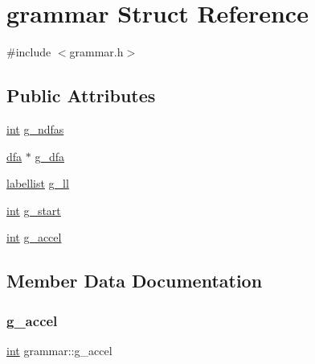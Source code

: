 \hypertarget{structgrammar}{}\section{grammar Struct Reference}
\label{structgrammar}


{\ttfamily \#include $<$grammar.\+h$>$}

\subsection*{Public Attributes}
\begin{DoxyCompactItemize}
\item 
\mbox{\hyperlink{warnings_8h_a74f207b5aa4ba51c3a2ad59b219a423b}{int}} \mbox{\hyperlink{structgrammar_abf22ce0269bc0d85b5664fc390f5441f}{g\+\_\+ndfas}}
\item 
\mbox{\hyperlink{structdfa}{dfa}} $\ast$ \mbox{\hyperlink{structgrammar_a5f1487bf454c13350ffbd11ed08cd160}{g\+\_\+dfa}}
\item 
\mbox{\hyperlink{structlabellist}{labellist}} \mbox{\hyperlink{structgrammar_a44c2b2bf052d04fe115c96ebcd3cdb6d}{g\+\_\+ll}}
\item 
\mbox{\hyperlink{warnings_8h_a74f207b5aa4ba51c3a2ad59b219a423b}{int}} \mbox{\hyperlink{structgrammar_a07f66956b24bcf1d2560f64e97738843}{g\+\_\+start}}
\item 
\mbox{\hyperlink{warnings_8h_a74f207b5aa4ba51c3a2ad59b219a423b}{int}} \mbox{\hyperlink{structgrammar_a6bfa088665e4923c32933b3f40343ce2}{g\+\_\+accel}}
\end{DoxyCompactItemize}


\subsection{Member Data Documentation}
\mbox{\label{structgrammar_a6bfa088665e4923c32933b3f40343ce2}} 
\subsubsection{\texorpdfstring{g\_accel}{g\_accel}}
{\footnotesize\ttfamily \mbox{\hyperlink{warnings_8h_a74f207b5aa4ba51c3a2ad59b219a423b}{int}} grammar\+::g\+\_\+accel}

\mbox{\label{structgrammar_a5f1487bf454c13350ffbd11ed08cd160}} 
